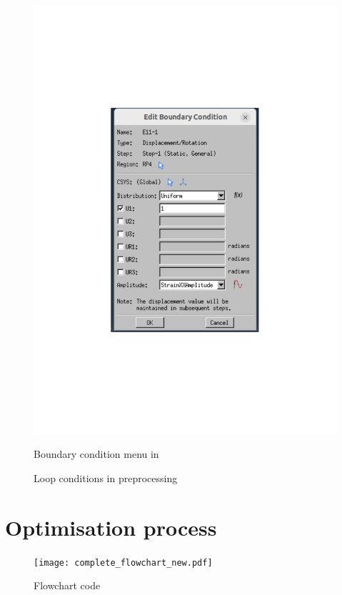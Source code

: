 \begin{figure}[H]
\begin{minipage}[T!]{1.0\textwidth}
\begin{minipage}[T!][9cm][T!]{0.35\textwidth}
            \includegraphics[width=1.0\textwidth]{BC.pdf}
            \vfill{}
            \caption{Boundary condition menu in }
            \label{fig:bcmenu}
        \end{minipage}
    \end{minipage}    
    \caption{Loop conditions in preprocessing}
    \label{fig:Abaqus Settings}
\end{figure}

\section{Optimisation process} \label{sec: optimizationCode}

\begin{figure}[H]
    \texttt{[image: complete\_flowchart\_new.pdf]}
    \caption{Flowchart code}
    \label{fig: flowchart}
\end{figure}

